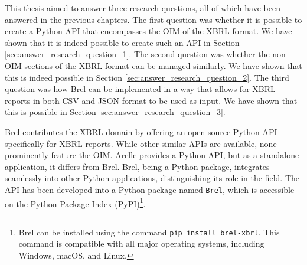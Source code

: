 This thesis aimed to answer three research questions, all of which have been answered in the previous chapters.
The first question was whether it is possible to create a Python API that encompasses the OIM of the XBRL format.
We have shown that it is indeed possible to create such an API in Section \ref{sec:answer_research_question_1}.
The second question was whether the non-OIM sections of the XBRL format can be managed similarly.
We have shown that this is indeed possible in Section \ref{sec:answer_research_question_2}.
The third question was how Brel can be implemented in a way that allows for XBRL reports in both CSV and JSON format to be used as input.
We have shown that this is possible in Section \ref{sec:answer_research_question_3}.

Brel contributes the XBRL domain by offering an open-source Python API specifically for XBRL reports.
While other similar APIs are available, none prominently feature the OIM.
Arelle provides a Python API, but as a standalone application, it differs from Brel.
Brel, being a Python package, integrates seamlessly into other Python applications, distinguishing its role in the field.
The API has been developed into a Python package named \texttt{Brel},
which is accessible on the Python Package Index (PyPI)\footnote{Brel can be installed using the command \texttt{pip install brel-xbrl}. This command is compatible with all major operating systems, including Windows, macOS, and Linux.}.

